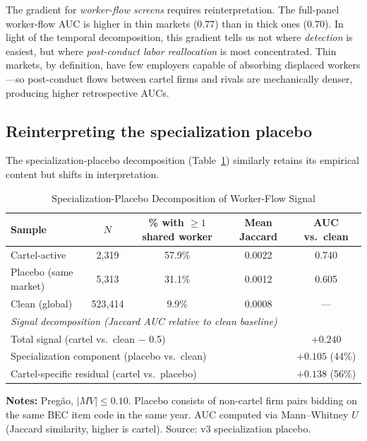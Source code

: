 The gradient for \emph{worker-flow screens} requires reinterpretation. The full-panel worker-flow AUC is higher in thin markets ($0.77$) than in thick ones ($0.70$). In light of the temporal decomposition, this gradient tells us not where \emph{detection} is easiest, but where \emph{post-conduct labor reallocation} is most concentrated. Thin markets, by definition, have few employers capable of absorbing displaced workers---so post-conduct flows between cartel firms and rivals are mechanically denser, producing higher retrospective AUCs.

\subsection{Reinterpreting the specialization placebo}\label{sec:res_placebo}

The specialization-placebo decomposition (Table~\ref{tab:placebo}) similarly retains its empirical content but shifts in interpretation.

\begin{table}[htbp]
\centering
\caption{Specialization-Placebo Decomposition of Worker-Flow Signal}\label{tab:placebo}
\begin{tabular}{lcccc}
\toprule
Sample & $N$ & \% with $\ge 1$ shared worker & Mean Jaccard & AUC vs.\ clean \\
\midrule
Cartel-active & 2{,}319 & 57.9\% & 0.0022 & 0.740 \\
Placebo (same market) & 5{,}313 & 31.1\% & 0.0012 & 0.605 \\
Clean (global) & 523{,}414 & 9.9\% & 0.0008 & --- \\[6pt]
\multicolumn{5}{l}{\emph{Signal decomposition (Jaccard AUC relative to clean baseline)}} \\[3pt]
\multicolumn{4}{l}{\quad Total signal (cartel vs.\ clean $-$ 0.5)} & $+0.240$ \\
\multicolumn{4}{l}{\quad Specialization component (placebo vs.\ clean)} & $+0.105$ \quad (44\%) \\
\multicolumn{4}{l}{\quad Cartel-specific residual (cartel vs.\ placebo)} & $+0.138$ \quad (56\%) \\
\bottomrule
\end{tabular}
\vspace{0.5em}
\begin{minipage}{0.95\textwidth}
\scriptsize{\textbf{Notes:} Pregão, $\lvert MV \rvert \le 0.10$. Placebo consists of non-cartel firm pairs bidding on the same BEC item code in the same year. AUC computed via Mann--Whitney $U$ (Jaccard similarity, higher is cartel). Source: v3 specialization placebo.\par}
\end{minipage}
\end{table}


